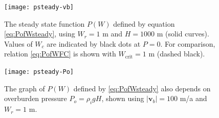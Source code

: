 \documentclass[gmd]{copernicus}   %
\begin{document}
\begin{figure}[ht]
\texttt{[image: psteady-vb]}
\caption{The steady state function $P(W)$ defined by equation \eqref{eq:PofWsteady}, using $W_r=1$ m and $H=1000$ m (solid curves).  Values of $W_c$ are indicated by black dots at $P=0$.  For comparison, \cite{FlowersClarke2002_theory} relation \eqref{eq:PofWFC} is shown with $W_{\text{crit}}=1$ m (dashed black).}
\label{fig:psteady-vb}
\end{figure}

\begin{figure}[ht]
\texttt{[image: psteady-Po]}
\caption{The graph of $P(W)$ defined by \eqref{eq:PofWsteady} also depends on overburden pressure $P_o=\rho_i g H$, shown using $|\mathbf{v}_b|=100$ m/a and $W_r=1$ m.}
\label{fig:psteady-Po}
\end{figure}
\end{document}
